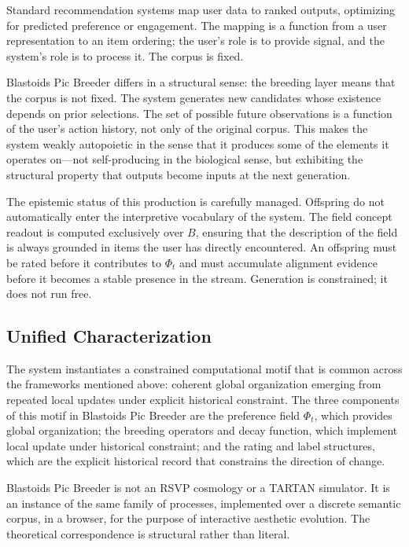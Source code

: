 \documentclass[12pt, a4paper]{article}
\theoremstyle{definition}
\begin{document}
Standard recommendation systems map user data to ranked outputs, optimizing for predicted preference or engagement. The mapping is a function from a user representation to an item ordering; the user's role is to provide signal, and the system's role is to process it. The corpus is fixed.

Blastoids Pic Breeder differs in a structural sense: the breeding layer means that the corpus is not fixed. The system generates new candidates whose existence depends on prior selections. The set of possible future observations is a function of the user's action history, not only of the original corpus. This makes the system weakly autopoietic in the sense that it produces some of the elements it operates on---not self-producing in the biological sense, but exhibiting the structural property that outputs become inputs at the next generation.

The epistemic status of this production is carefully managed. Offspring do not automatically enter the interpretive vocabulary of the system. The field concept readout is computed exclusively over $B$, ensuring that the description of the field is always grounded in items the user has directly encountered. An offspring must be rated before it contributes to $\Phi_t$ and must accumulate alignment evidence before it becomes a stable presence in the stream. Generation is constrained; it does not run free.

\subsection{Unified Characterization}

The system instantiates a constrained computational motif that is common across the frameworks mentioned above: coherent global organization emerging from repeated local updates under explicit historical constraint. The three components of this motif in Blastoids Pic Breeder are the preference field $\Phi_t$, which provides global organization; the breeding operators and decay function, which implement local update under historical constraint; and the rating and label structures, which are the explicit historical record that constrains the direction of change.

Blastoids Pic Breeder is not an RSVP cosmology or a TARTAN simulator. It is an instance of the same family of processes, implemented over a discrete semantic corpus, in a browser, for the purpose of interactive aesthetic evolution. The theoretical correspondence is structural rather than literal.
\end{document}
